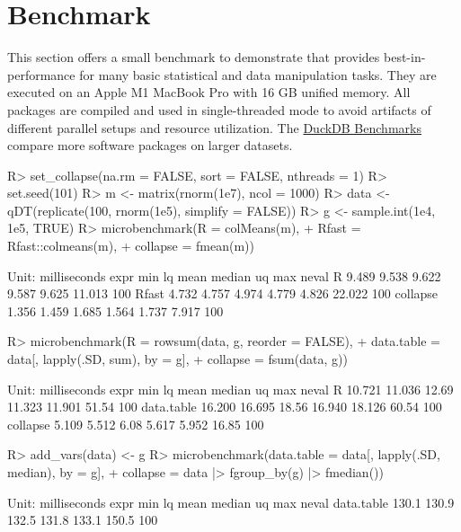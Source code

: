 \documentclass[article]{jss}
\begin{document}
\section{Benchmark} \label{sec:bench}
%
This section offers a small benchmark to demonstrate that  provides best-in- performance for many basic statistical and data manipulation tasks. They are executed on an Apple M1 MacBook Pro with 16 GB unified memory. All packages are compiled and used in single-threaded mode to avoid artifacts of different parallel setups and resource utilization. The \href{https://duckdblabs.github.io/db-benchmark/}{DuckDB Benchmarks} compare more software packages on larger datasets.
%
\begin{Schunk}
\begin{Sinput}
R> set_collapse(na.rm = FALSE, sort = FALSE, nthreads = 1)
R> set.seed(101)
R> m <- matrix(rnorm(1e7), ncol = 1000)
R> data <- qDT(replicate(100, rnorm(1e5), simplify = FALSE))
R> g <- sample.int(1e4, 1e5, TRUE)
R> microbenchmark(R = colMeans(m),
+                 Rfast = Rfast::colmeans(m),
+                 collapse = fmean(m))
\end{Sinput}
\begin{Soutput}
Unit: milliseconds
     expr   min    lq  mean median    uq    max neval
        R 9.489 9.538 9.622  9.587 9.625 11.013   100
    Rfast 4.732 4.757 4.974  4.779 4.826 22.022   100
 collapse 1.356 1.459 1.685  1.564 1.737  7.917   100
\end{Soutput}
\begin{Sinput}
R> microbenchmark(R = rowsum(data, g, reorder = FALSE),
+                 data.table = data[, lapply(.SD, sum), by = g],
+                 collapse = fsum(data, g))
\end{Sinput}
\begin{Soutput}
Unit: milliseconds
       expr    min     lq  mean median     uq   max neval
          R 10.721 11.036 12.69 11.323 11.901 51.54   100
 data.table 16.200 16.695 18.56 16.940 18.126 60.54   100
   collapse  5.109  5.512  6.08  5.617  5.952 16.85   100
\end{Soutput}
\begin{Sinput}
R> add_vars(data) <- g
R> microbenchmark(data.table = data[, lapply(.SD, median), by = g],
+                 collapse = data |> fgroup_by(g) |> fmedian())
\end{Sinput}
\begin{Soutput}
Unit: milliseconds
       expr   min    lq  mean median    uq   max neval
 data.table 130.1 130.9 132.5  131.8 133.1 150.5   100

\end{Soutput}
\end{Schunk}
\end{document}
